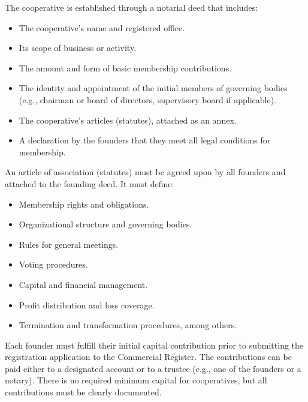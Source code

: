 The cooperative is established through a notarial deed that includes:
\begin{itemize}
    \item The cooperative’s name and registered office.
    \item Its scope of business or activity.
    \item The amount and form of basic membership contributions.
    \item The identity and appointment of the initial members of governing bodies (e.g., chairman or board of directors, supervisory board if applicable).
    \item The cooperative's articles (statutes), attached as an annex.
    \item A declaration by the founders that they meet all legal conditions for membership.
\end{itemize}
An article of association (statutes) must be agreed upon by all founders and attached to the founding deed. It must define:
\begin{itemize}
    \item Membership rights and obligations.
    \item Organizational structure and governing bodies.
    \item Rules for general meetings.
    \item Voting procedures.
    \item Capital and financial management.
    \item Profit distribution and loss coverage.
    \item Termination and transformation procedures, among others.
\end{itemize}
Each founder must fulfill their initial capital contribution prior to submitting the registration application to the Commercial Register. The contributions can be paid either to a designated account or to a trustee (e.g., one of the founders or a notary). There is no required minimum capital for cooperatives, but all contributions must be clearly documented.

